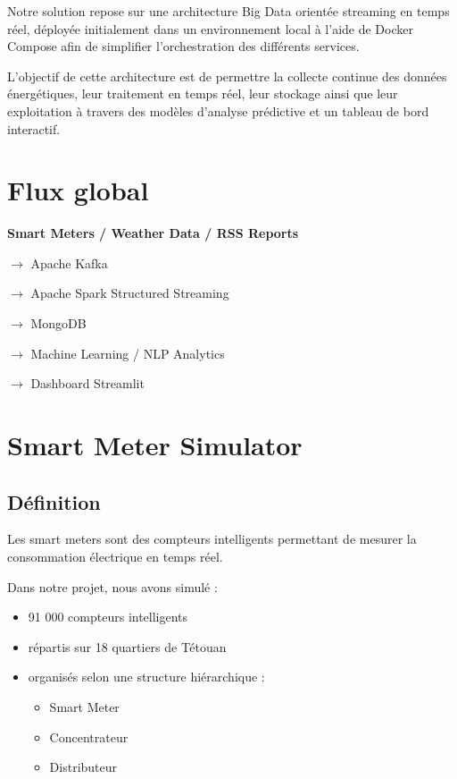 \documentclass[12pt,a4paper]{report}
\begin{document}
Notre solution repose sur une architecture Big Data orientée streaming en temps réel, déployée initialement dans un environnement local à l’aide de Docker Compose afin de simplifier l’orchestration des différents services.

L’objectif de cette architecture est de permettre la collecte continue des données énergétiques, leur traitement en temps réel, leur stockage ainsi que leur exploitation à travers des modèles d’analyse prédictive et un tableau de bord interactif.

\section{Flux global}

\textbf{Smart Meters / Weather Data / RSS Reports}

$\rightarrow$ Apache Kafka

$\rightarrow$ Apache Spark Structured Streaming

$\rightarrow$ MongoDB

$\rightarrow$ Machine Learning / NLP Analytics

$\rightarrow$ Dashboard Streamlit

\section{Smart Meter Simulator}

\subsection{Définition}

Les smart meters sont des compteurs intelligents permettant de mesurer la consommation électrique en temps réel.

Dans notre projet, nous avons simulé :

\begin{itemize}
    \item 91 000 compteurs intelligents
    \item répartis sur 18 quartiers de Tétouan
    \item organisés selon une structure hiérarchique :
    \begin{itemize}
        \item Smart Meter
        \item Concentrateur
        \item Distributeur
    \end{itemize}
\end{itemize}
\end{document}
